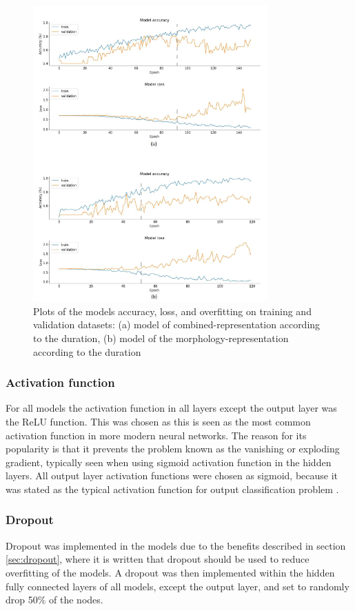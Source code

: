 \begin{figure} [H]
\centering
\includegraphics[width=0.8\textwidth]{figures/graphs1}
\caption{Plots of the models accuracy, loss, and overfitting on training and validation datasets: (a) model of combined-representation according to the duration, (b) model of the morphology-representation according to the duration}
\label{fig:graphs1}
\end{figure}


\subsubsection{Activation function}
For all models the activation function in all layers except the output layer was the ReLU function. This was chosen as this is seen as the most common activation function in more modern neural networks. The reason for its popularity is that it prevents the problem known as the vanishing or exploding gradient, typically seen when using sigmoid activation function in the hidden layers.\citep{Goodfellow2016}   
All output layer activation functions were chosen as sigmoid, because it was stated as the typical activation function for output classification problem \citep{Duda2000}.

\subsubsection{Dropout}
Dropout was implemented in the models due to the benefits described in section \ref{sec:dropout}, where it is written that dropout should be used to reduce overfitting of the models. A dropout was then implemented within the hidden fully connected layers of all models, except the output layer, and set to randomly drop 50\% of the nodes. 


